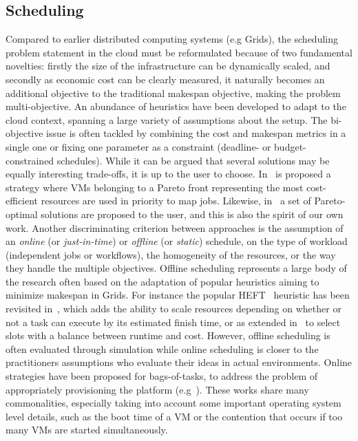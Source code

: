 \documentclass[10pt,conference,compsocconf]{IEEEtran}
\begin{document}
\subsection{Scheduling}
Compared to earlier distributed computing systems (e.g Grids), the scheduling
problem statement in the cloud must be reformulated because of two fundamental
novelties: firstly the size of the infrastructure can be dynamically scaled, and
secondly as economic cost can be clearly measured, it naturally becomes an
additional objective to the traditional makespan objective, making the problem
multi-objective. An abundance of heuristics have been developed to adapt to the
cloud context, spanning a large variety of assumptions about the setup. The
bi-objective issue is often tackled by combining the cost and makespan metrics
in a single one or fixing one parameter as a constraint (deadline- or budget-
constrained schedules). While it can be argued that several solutions may be
equally interesting trade-offs, it is up to the user to choose. In~\cite{Su13}
is proposed a strategy where VMs belonging to a Pareto front representing the
most cost-efficient resources are used in priority to map jobs. Likewise,
in~\cite{Durillo14} a set of Pareto-optimal solutions are proposed to the user,
and this is also the spirit of our own work. Another discriminating criterion
between approaches is the assumption of an \emph{online} (or
\emph{just-in-time}) or \emph{offline} (or \emph{static}) schedule, on the type
of workload (independent jobs or workflows), the homogeneity of the resources,
or the way they handle the multiple objectives. Offline scheduling represents a
large body of the research often based on the adaptation of popular heuristics
aiming to minimize makespan in Grids. For instance the popular
HEFT~\cite{Zhao2003} heuristic has been revisited in~\cite{LinL11}, which adds
the ability to scale resources depending on whether or not a task can execute by
its estimated finish time, or as extended in~\cite{Li11cost-conscious} to select
slots with a balance between runtime and cost. However, offline scheduling is
often evaluated through simulation while online scheduling is closer to the
practitioners assumptions who evaluate their ideas in actual environments.
Online strategies have been proposed for bags-of-tasks, to address the problem
of appropriately provisioning the platform
(e.g~\cite{MarshallKF10,GenaudG11,DuongLG11,VillegasASI12}). These works share
many commonalities, especially taking into account some important operating
system level details, such as the boot time of a VM or the contention that
occurs if too many VMs are started simultaneously. 
\end{document}

